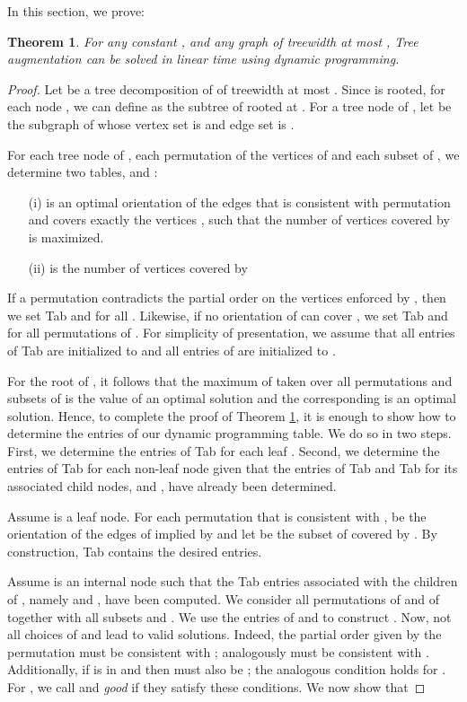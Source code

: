 \documentclass{article}
\newtheorem{theorem}{Theorem}
\begin{document}
In this section, we prove:
\begin{theorem}\label{thm:tw}
For any constant , and any graph  of treewidth at most ,
{\sc Tree augmentation} 
can be solved in linear time using dynamic programming.
\end{theorem}

\begin{proof}
Let   be a tree decomposition of  of treewidth at most .
Since  is rooted, for each node , we can define  as the subtree of  rooted at .
For a tree node  of , let  be the subgraph of  whose vertex set is  and edge set is .  

For each tree node  of , each permutation  of the vertices of  
and each subset  of , we determine two tables,  and :
\begin{enumerate}
\item [(i)]  is an optimal orientation of the edges 
that is consistent with permutation  and covers exactly the vertices , such that the number of vertices covered by  is maximized.
\item [(ii)]  is the number of vertices covered by 
\end{enumerate}
If a permutation  contradicts the partial order on the vertices enforced by , then we set {\sc Tab} and  for all .  Likewise, if no orientation of  can cover , we set {\sc Tab} and  for all permutations  of .  For simplicity of presentation, we assume that all entries of {\sc Tab} are initialized to  and all entries of  are initialized to .

For the root  of , it follows that the maximum of  taken over all permutations  and subsets  of  is the value of an optimal solution and the corresponding  is an optimal solution.
Hence, to complete the proof of Theorem \ref{thm:tw}, it is enough to show how to determine the entries of our dynamic programming table.
We do so in two steps.
First, we determine the entries of {\sc Tab} for each leaf .
Second, we determine the entries of {\sc Tab} for each non-leaf node  given that the entries of {\sc Tab} and {\sc Tab} for its associated child nodes,  and , have already been determined.  

Assume   is a leaf node.  For each permutation  that is consistent with ,  be the orientation of the edges of  implied by  and let  be the subset of  covered by .  By construction,  {\sc Tab} contains the desired entries.

Assume  is an internal node such that the {\sc Tab} entries associated with the children of , namely  and , have been computed.  
We consider all permutations  of  and  of  together with all subsets  and .
We use the entries of  and  to construct .
Now, not all choices of  and  lead to valid solutions.
Indeed, the partial order given by the permutation  must be consistent with ; analogously  must be consistent with . 
Additionally, if  is in  and  then  must also be ; the analogous condition holds for . 
For , we call  and   {\em good} if they satisfy these conditions.
We now show that 


\end{proof}
\end{document}

